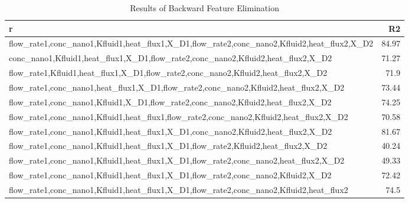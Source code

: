 
    \begin{table*}
        \centering
        \begin{tabular}{p{12cm}r}r}
\hline
\hline
 features                                                                                            &    R2 \\
\hline
 flow\_rate1,conc\_nano1,Kfluid1,heat\_flux1,X\_D1,flow\_rate2,conc\_nano2,Kfluid2,heat\_flux2,X\_D2 & 84.97 \\
 conc\_nano1,Kfluid1,heat\_flux1,X\_D1,flow\_rate2,conc\_nano2,Kfluid2,heat\_flux2,X\_D2             & 71.27 \\
 flow\_rate1,Kfluid1,heat\_flux1,X\_D1,flow\_rate2,conc\_nano2,Kfluid2,heat\_flux2,X\_D2             & 71.9  \\
 flow\_rate1,conc\_nano1,heat\_flux1,X\_D1,flow\_rate2,conc\_nano2,Kfluid2,heat\_flux2,X\_D2         & 73.44 \\
 flow\_rate1,conc\_nano1,Kfluid1,X\_D1,flow\_rate2,conc\_nano2,Kfluid2,heat\_flux2,X\_D2             & 74.25 \\
 flow\_rate1,conc\_nano1,Kfluid1,heat\_flux1,flow\_rate2,conc\_nano2,Kfluid2,heat\_flux2,X\_D2       & 70.58 \\
 flow\_rate1,conc\_nano1,Kfluid1,heat\_flux1,X\_D1,conc\_nano2,Kfluid2,heat\_flux2,X\_D2             & 81.67 \\
 flow\_rate1,conc\_nano1,Kfluid1,heat\_flux1,X\_D1,flow\_rate2,Kfluid2,heat\_flux2,X\_D2             & 40.24 \\
 flow\_rate1,conc\_nano1,Kfluid1,heat\_flux1,X\_D1,flow\_rate2,conc\_nano2,heat\_flux2,X\_D2         & 49.33 \\
 flow\_rate1,conc\_nano1,Kfluid1,heat\_flux1,X\_D1,flow\_rate2,conc\_nano2,Kfluid2,X\_D2             & 72.42 \\
 flow\_rate1,conc\_nano1,Kfluid1,heat\_flux1,X\_D1,flow\_rate2,conc\_nano2,Kfluid2,heat\_flux2       & 74.5  \\
\hline
\end{tabular}
\hline
        \caption{Results of Backward Feature Elimination}
        \label{backward}
    \end{table*}
    
